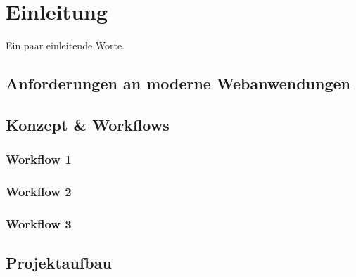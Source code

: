 \newpage

\section{Einleitung} \label{einleitung}
Ein paar einleitende Worte.

\subsection{Anforderungen an moderne Webanwendungen} \label{anforderungen}


\subsection{Konzept \& Workflows} \label{konzeptWorkflows}

\subsubsection{Workflow 1} \label{workflow1}

\subsubsection{Workflow 2} \label{workflow2}

\subsubsection{Workflow 3} \label{workflow3}


\subsection{Projektaufbau} \label{projektaufbau}
